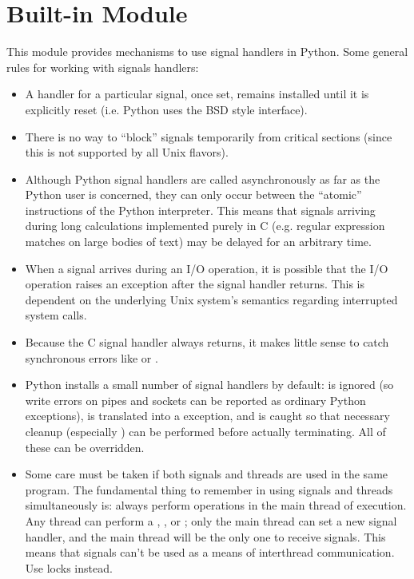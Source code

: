 \section{Built-in Module }

This module provides mechanisms to use signal handlers in Python.
Some general rules for working with signals handlers:

\begin{itemize}

\item
A handler for a particular signal, once set, remains installed until
it is explicitly reset (i.e. Python uses the BSD style interface).

\item
There is no way to ``block'' signals temporarily from critical
sections (since this is not supported by all Unix flavors).

\item
Although Python signal handlers are called asynchronously as far as
the Python user is concerned, they can only occur between the
``atomic'' instructions of the Python interpreter.  This means that
signals arriving during long calculations implemented purely in C
(e.g. regular expression matches on large bodies of text) may be
delayed for an arbitrary time.

\item
When a signal arrives during an I/O operation, it is possible that the
I/O operation raises an exception after the signal handler returns.
This is dependent on the underlying Unix system's semantics regarding
interrupted system calls.

\item
Because the C signal handler always returns, it makes little sense to
catch synchronous errors like  or .

\item
Python installs a small number of signal handlers by default:
 is ignored (so write errors on pipes and sockets can be
reported as ordinary Python exceptions),  is translated
into a  exception, and  is
caught so that necessary cleanup (especially ) can
be performed before actually terminating.  All of these can be
overridden.

\item
Some care must be taken if both signals and threads are used in the
same program.  The fundamental thing to remember in using signals and
threads simultaneously is: always perform  operations
in the main thread of execution.  Any thread can perform a
, , or ; only the main
thread can set a new signal handler, and the main thread will be the
only one to receive signals.  This means that signals can't be used as
a means of interthread communication.  Use locks instead.

\end{itemize}

